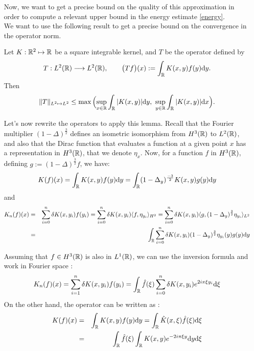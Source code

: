 \documentclass[11pt,a4paper]{article}
\begin{document}
Now, we want to get a precise bound on the quality of this approximation in order to compute a relevant upper bound in the energy estimate \ref{energy}. \\
We want to use the following result to get a precise bound on the convergence in the operator norm.
\begin{lemma}\label{schur}
Let $K: \mathbb R^2 \mapsto \mathbb R$ be a square integrable kernel, and $T$ be the operator defined by 
\[ T: L^2(\mathbb R) \longrightarrow L^2(\mathbb R), \qquad \big(Tf\big)(x) := \int_{\mathbb R}K(x,y) f(y)\mathrm{d}y. \] 
Then \[\displaystyle \|T\|_{L^2\mapsto L^2} \leq \max\Big({ \sup_{x\in \mathbb R} \int_\mathbb R |K(x,y)|\mathrm{d}y,\  \sup_{y\in \mathbb R} \int_\mathbb R |K(x,y)|\mathrm{d}x}\Big).\] 
\end{lemma}

Let's now rewrite the operators to apply this lemma. Recall that the Fourier multiplier $(1-\Delta)^\frac{3}{2}$ defines an isometric isomorphism from $H^3(\mathbb R)$ to $L^2(\mathbb R)$, and also that the Dirac function that evaluates a function at a given point $x$ has a representation in $H^3(\mathbb R)$, that we denote $\eta_x$. Now, for a function $f$ in $H^3(\mathbb R)$, defining $g:=(1-\Delta)^\frac{3}{2}f$, we have: 
\[K(f)(x) = \int_\mathbb R K(x,y)f(y)\mathrm{d}y = \int_\mathbb R(1-\Delta_y)^\frac{-3}{2} K(x,y)g(y)\mathrm{d}y\]
and 
\begin{eqnarray*}
K_n(f)(x) &=& \sum_{i=0}^n \delta K(x,y_i)f(y_i) = \sum_{i=0}^n \delta K(x,y_i)\langle f, \eta_{y_i} \rangle_{H^3} =   \sum_{i=0}^n \delta K(x,y_i)\langle g, (1-\Delta_y)^\frac{3}{2}\eta_{y_i} \rangle_{L^2} \\
&=&\int_\mathbb R \sum_{i=0}^n \delta K(x,y_i)(1-\Delta_y)^\frac{3}{2}\eta_{y_i}(y)g(y)\mathrm{d}y 
\end{eqnarray*} 


Assuming that $f\in H^3(\mathbb R)$ is also in $L^1(\mathbb R)$, we can use the inversion formula and work in Fourier space :
\begin{equation}\label{int_finite}
K_n(f)(x) =  \sum_{i=1}^n\delta K(x,y_i)f(y_i) = \int_\mathbb R \hat{f}(\xi)\sum_{i=0}^n \delta K(x,y_i) e^{2i\pi\xi y_i}\mathrm{d}\xi
\end{equation}
On the other hand, the operator can be written as :
\begin{eqnarray*}
K(f)(x) &=& \int_\mathbb R K(x,y)f(y)\mathrm{d}y = \int_\mathbb R \hat{K}(x,\xi)\hat{f}(\xi)\mathrm{d}\xi \\
&=& \int_\mathbb R \hat{f}(\xi) \int_\mathbb R K(x,y)e^{-2i\pi\xi y}\mathrm{d}y \mathrm{d}\xi 
\end{eqnarray*}
\end{document}
